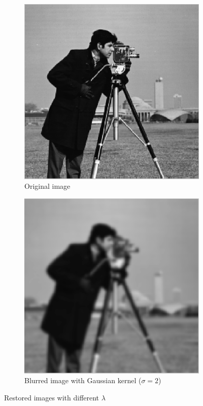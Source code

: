 \documentclass[a4paper, 10pt, conference] {article}
\begin{document}
\begin{figure}[H]
	\centering
	\begin{subfigure}{0.49\textwidth} 
		\centering						
		\includegraphics[scale=0.48]{gaussian/no_noise/original.PNG}
		\caption{Original image}
	\end{subfigure}
	\begin{subfigure}{0.49\textwidth}
		\centering
		\includegraphics[scale=0.48]{gaussian/no_noise/blurred_sigma2.PNG}
		\caption{Blurred image with Gaussian kernel ($\sigma = 2$)}
	\end{subfigure}
	\caption{Restored images with different $\lambda$}
	\label{noNoiseOriginal}
\end{figure}
\end{document}

